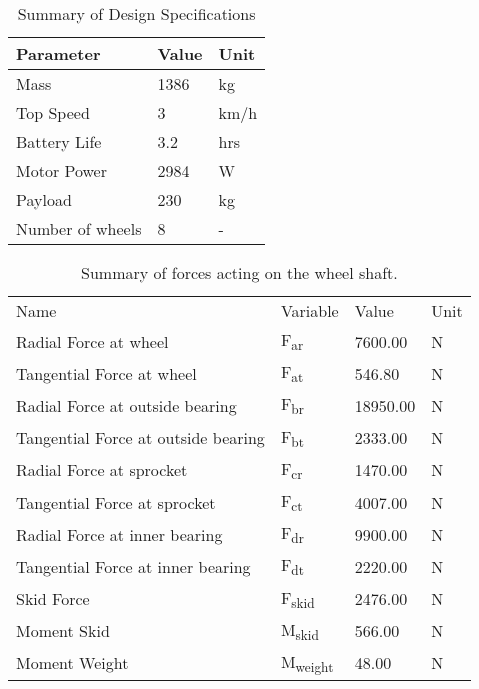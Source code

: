 \begin{table}[htbp]
\centering
\caption{Summary of Design Specifications}
\begin{tabular}{| lll |} \hline
Parameter & Value & Unit \\ \hline
Mass & 1386 & kg \\
Top Speed & 3 & km/h \\
Battery Life & 3.2 & hrs \\
Motor Power & 2984 & W \\
Payload & 230 & kg \\
Number of wheels & 8 & - \\
\end{tabular}
\label{tab:design_spec}
\end{table}


\begin{table}[htbp]
\centering
\caption{Summary of forces acting on the wheel shaft.}
\begin{tabular}{| llll |} \hline
Name & Variable & Value & Unit \\
Radial Force at wheel & F\textsubscript{ar} & 7600.00 & N \\
Tangential Force at wheel & F\textsubscript{at} & 546.80 & N \\
Radial Force at outside bearing & F\textsubscript{br} & 18950.00 & N \\
Tangential Force at outside bearing & F\textsubscript{bt} & 2333.00 & N \\
Radial Force at sprocket & F\textsubscript{cr} & 1470.00 & N \\
Tangential Force at sprocket & F\textsubscript{ct} & 4007.00 & N \\
Radial Force at inner bearing & F\textsubscript{dr} & 9900.00 & N \\
Tangential Force at inner bearing & F\textsubscript{dt} & 2220.00 & N \\
Skid Force & F\textsubscript{skid} & 2476.00 & N \\
Moment Skid & M\textsubscript{skid} & 566.00 & N \\
Moment Weight & M\textsubscript{weight} & 48.00 & N \\
 \end{tabular}
 \label{tab:shaft_calc}
 \end{table}
 
